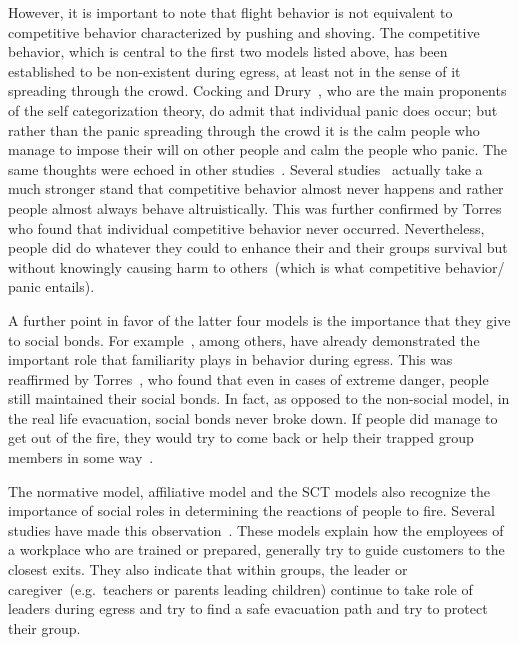 However, it is important to note that flight behavior is not equivalent to competitive behavior characterized by pushing and shoving. The competitive behavior, which is central to the first two models listed above, has been established to be non-existent during egress, at least not in the sense of it spreading through the crowd. Cocking and Drury~\cite{Cocking:2005uc}, who are the main proponents of the self categorization theory, do admit that individual panic does occur; but rather than the panic spreading through the crowd it is the calm people who manage to impose their will on other people and calm the people who panic. The same thoughts were echoed in other studies~\cite{Paulsen:1984ti,Sime:1983uy,Schadschneider:2008cz}. Several studies~\cite{Sime:1983uy,Paulsen:1984ti,Drury:2009ga} actually take a much stronger stand that competitive behavior almost never happens and rather people almost always behave altruistically. This was further confirmed by Torres~\cite{Torres:2010tj} who found that individual competitive behavior never occurred. Nevertheless, people did do whatever they could to enhance their and their groups survival but without knowingly causing harm to others~(which is what competitive behavior/ panic entails).

A further point in favor of the latter four models is the importance that they give to social bonds. For example~\cite{Cornwell:2003uo,Chertkoff:1996vw,Andree:2008td}, among others, have already demonstrated the important role that familiarity plays in behavior during egress. This was reaffirmed by Torres~\cite{Torres:2010tj}, who found that even in cases of extreme danger, people still maintained their social bonds. In fact, as opposed to the non-social model, in the real life evacuation, social bonds never broke down. If people did manage to get out of the fire, they would try to come back or help their trapped group members in some way~\cite{Torres:2010tj,Kobes:2009jx}.

The normative model, affiliative model and the SCT models also recognize the importance of social roles in determining the reactions of people to fire. Several studies have made this observation~\cite{Proulx:2003tc,Proulx:2001we,Paulsen:1984ti,Sandberg:1997tw,Cocking:2008vv,Tong:1985wn}. These models explain how the employees of a workplace who are trained or prepared, generally try to guide customers to the closest exits. They also indicate that within groups, the leader or caregiver~(e.g.\ teachers or parents leading children) continue to take role of leaders during egress and try to find a safe evacuation path and try to protect their group.

